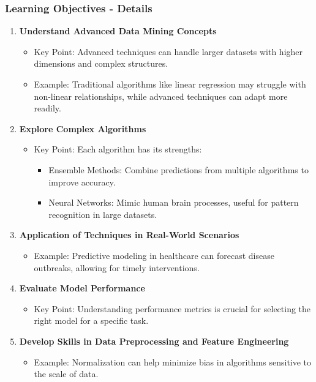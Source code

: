 \documentclass{beamer}
\begin{document}
\begin{frame}[fragile]
    \frametitle{Learning Objectives - Details}
    \begin{enumerate}
        \item \textbf{Understand Advanced Data Mining Concepts} 
            \begin{itemize}
                \item Key Point: Advanced techniques can handle larger datasets with higher dimensions and complex structures.
                \item Example: Traditional algorithms like linear regression may struggle with non-linear relationships, while advanced techniques can adapt more readily.
            \end{itemize}

        \item \textbf{Explore Complex Algorithms}
            \begin{itemize}
                \item Key Point: Each algorithm has its strengths:
                \begin{itemize}
                    \item Ensemble Methods: Combine predictions from multiple algorithms to improve accuracy.
                    \item Neural Networks: Mimic human brain processes, useful for pattern recognition in large datasets.
                \end{itemize}
            \end{itemize}
        
        \item \textbf{Application of Techniques in Real-World Scenarios}
            \begin{itemize}
                \item Example: Predictive modeling in healthcare can forecast disease outbreaks, allowing for timely interventions.
            \end{itemize}

        \item \textbf{Evaluate Model Performance}
            \begin{itemize}
                \item Key Point: Understanding performance metrics is crucial for selecting the right model for a specific task.
            \end{itemize}
        
        \item \textbf{Develop Skills in Data Preprocessing and Feature Engineering}
            \begin{itemize}
                \item Example: Normalization can help minimize bias in algorithms sensitive to the scale of data.
            \end{itemize}
    \end{enumerate}
\end{frame}
\end{document}
